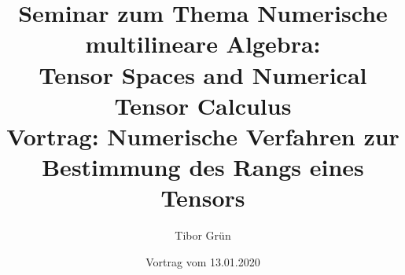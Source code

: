 



\usepackage[a4paper,%
            left=2.5cm,right=2.5cm,top=2.5cm,bottom=2.5cm,%
            footskip=.6cm]{geometry}

\def\changemargin#1#2{\list{}{\rightmargin#2\leftmargin#1}\item[]}
\let\endchangemargin=\endlist


\usepackage{graphicx} %
\usepackage[parfill]{parskip} %


\usepackage{booktabs} %
\usepackage{array} %
\usepackage{paralist} %
\usepackage{verbatim} %
\usepackage{subfig} %


\usepackage{float}
\usepackage[all]{xy}
\usepackage{booktabs}
\usepackage{makecell}
\usepackage{enumerate}
\usepackage{scrextend}
\usepackage{mathtools}
\usepackage{yfonts}
\usepackage{setspace} 

\title{\LARGE Seminar zum Thema Numerische multilineare Algebra:\\
\LARGE Tensor Spaces and Numerical Tensor Calculus\\
\vspace{5mm} %
\large Vortrag: Numerische Verfahren zur Bestimmung des Rangs eines Tensors}

\date{Vortrag vom 13.01.2020}

\author{Tibor Gr{\"u}n}


\makeatletter
\renewcommand{\@seccntformat}[1]{%
  \ifcsname prefix@#1\endcsname
    \csname prefix@#1\endcsname
  \else
    \csname the#1\endcsname\quad
  \fi}
\newcommand\prefix@section{Kapitel \thesection: }
\makeatother


